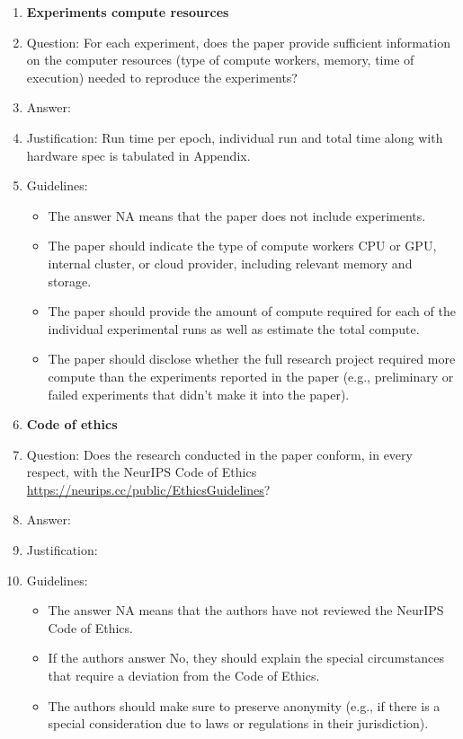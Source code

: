 \documentclass{article}
\begin{document}
\begin{enumerate}
\item {\bf Experiments compute resources}
    \item[] Question: For each experiment, does the paper provide sufficient information on the computer resources (type of compute workers, memory, time of execution) needed to reproduce the experiments?
    \item[] Answer: \answerYes{} %
    \item[] Justification: Run time per epoch, individual run and total time along with hardware spec is tabulated in Appendix.
    \item[] Guidelines:
    \begin{itemize}
        \item The answer NA means that the paper does not include experiments.
        \item The paper should indicate the type of compute workers CPU or GPU, internal cluster, or cloud provider, including relevant memory and storage.
        \item The paper should provide the amount of compute required for each of the individual experimental runs as well as estimate the total compute. 
        \item The paper should disclose whether the full research project required more compute than the experiments reported in the paper (e.g., preliminary or failed experiments that didn't make it into the paper). 
    \end{itemize}
    
\item {\bf Code of ethics}
    \item[] Question: Does the research conducted in the paper conform, in every respect, with the NeurIPS Code of Ethics \url{https://neurips.cc/public/EthicsGuidelines}?
    \item[] Answer: \answerYes{} %
    \item[] Justification:
    \item[] Guidelines:
    \begin{itemize}
        \item The answer NA means that the authors have not reviewed the NeurIPS Code of Ethics.
        \item If the authors answer No, they should explain the special circumstances that require a deviation from the Code of Ethics.
        \item The authors should make sure to preserve anonymity (e.g., if there is a special consideration due to laws or regulations in their jurisdiction).
    \end{itemize}



\end{enumerate}
\end{document}
